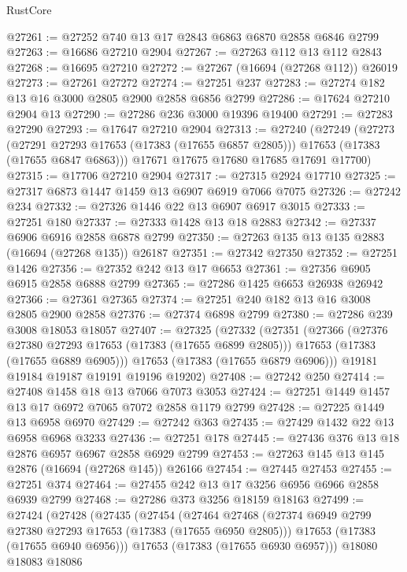 \begin{lexlean}{RustCore}
\begin{coremodule}
@27261 := @27252 @740 @13 @17 @2843 @6863 @6870 @2858 @6846 @2799
@27263 := @16686 @27210 @2904
@27267 := @27263 @112 @13 @112 @2843
@27268 := @16695 @27210
@27272 := @27267 (@16694 (@27268 @112)) @26019
@27273 := @27261 @27272
@27274 := @27251 @237
@27283 := @27274 @182 @13 @16 @3000 @2805 @2900 @2858 @6856 @2799
@27286 := @17624 @27210 @2904 @13
@27290 := @27286 @236 @3000 @19396 @19400
@27291 := @27283 @27290
@27293 := @17647 @27210 @2904
@27313 := @27240
    (@27249
      (@27273
        (@27291 @27293 @17653 (@17383 (@17655 @6857 @2805)))
        @17653
        (@17383 (@17655 @6847 @6863)))
      @17671
      @17675
      @17680
      @17685
      @17691
      @17700)
@27315 := @17706 @27210 @2904
@27317 := @27315 @2924 @17710
@27325 := @27317 @6873 @1447 @1459 @13 @6907 @6919 @7066 @7075
@27326 := @27242 @234
@27332 := @27326 @1446 @22 @13 @6907 @6917 @3015
@27333 := @27251 @180
@27337 := @27333 @1428 @13 @18 @2883
@27342 := @27337 @6906 @6916 @2858 @6878 @2799
@27350 := @27263 @135 @13 @135 @2883 (@16694 (@27268 @135)) @26187
@27351 := @27342 @27350
@27352 := @27251 @1426
@27356 := @27352 @242 @13 @17 @6653
@27361 := @27356 @6905 @6915 @2858 @6888 @2799
@27365 := @27286 @1425 @6653 @26938 @26942
@27366 := @27361 @27365
@27374 := @27251 @240 @182 @13 @16 @3008 @2805 @2900 @2858
@27376 := @27374 @6898 @2799
@27380 := @27286 @239 @3008 @18053 @18057
@27407 := @27325
    (@27332
      (@27351
        (@27366
          (@27376 @27380 @27293 @17653 (@17383 (@17655 @6899 @2805)))
          @17653
          (@17383 (@17655 @6889 @6905)))
        @17653
        (@17383 (@17655 @6879 @6906)))
      @19181
      @19184
      @19187
      @19191
      @19196
      @19202)
@27408 := @27242 @250
@27414 := @27408 @1458 @18 @13 @7066 @7073 @3053
@27424 := @27251 @1449 @1457 @13 @17 @6972 @7065 @7072 @2858 @1179 @2799
@27428 := @27225 @1449 @13 @6958 @6970
@27429 := @27242 @363
@27435 := @27429 @1432 @22 @13 @6958 @6968 @3233
@27436 := @27251 @178
@27445 := @27436 @376 @13 @18 @2876 @6957 @6967 @2858 @6929 @2799
@27453 := @27263 @145 @13 @145 @2876 (@16694 (@27268 @145)) @26166
@27454 := @27445 @27453
@27455 := @27251 @374
@27464 := @27455 @242 @13 @17 @3256 @6956 @6966 @2858 @6939 @2799
@27468 := @27286 @373 @3256 @18159 @18163
@27499 := @27424
    (@27428
      (@27435
        (@27454
          (@27464
            @27468
            (@27374 @6949 @2799 @27380 @27293 @17653 (@17383 (@17655 @6950 @2805)))
            @17653
            (@17383 (@17655 @6940 @6956)))
          @17653
          (@17383 (@17655 @6930 @6957)))
        @18080
        @18083
        @18086

\end{coremodule}
\end{lexlean}
